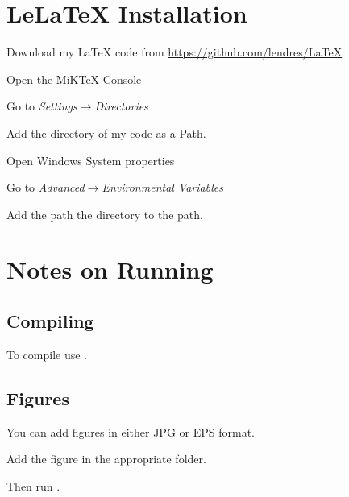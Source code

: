 \documentclass{lebook}
\begin{document}
\chapter{LeLaTeX Installation}
\begin{numberedlist}
	\item Download my LaTeX code from \url{https://github.com/lendres/LaTeX}
	\item Open the MiKTeX Console
	\item Go to \emph{Settings$\rightarrow$Directories}
	\item Add the directory of my code as a Path.
	\item Open Windows System properties
	\item Go to \emph{Advanced$\rightarrow$Environmental Variables}
	\item Add the path the  directory to the path.
\end{numberedlist}


\chapter{Notes on Running}
\section{Compiling}
\begin{bulletedlist}
	\item To compile use .
\end{bulletedlist}

\section{Figures}
You can add figures in either JPG or EPS format.
\begin{numberedlist}
	\item Add the figure in the appropriate folder.
	\begin{plainlist}
		\item {}
		\item {}
	\end{plainlist}
	\item Then run .
\end{numberedlist}
\end{document}

